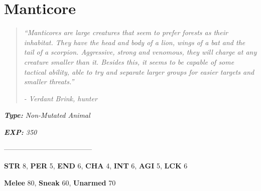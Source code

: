\documentclass[11pt,a4paper,twocolumn]{book}
\begin{document}
	\section*{Manticore}
	\begin{verse}
		\emph{``Manticores are large creatures that seem to prefer forests as their inhabitat. They have the head and body of a lion, wings of a bat and the tail of a scorpion. Aggressive, strong and venomous, they will charge at any creature smaller than it. Besides this, it seems to be capable of some tactical ability, able to try and separate larger groups for easier targets and smaller threats.''}
		
		\emph{-	Verdant Brink, hunter}
	\end{verse}
	
	\noindent
	\emph{\textbf{Type:} Non-Mutated Animal}
	
	\noindent
	\emph{\textbf{EXP:} 350}
	
%		
%	
%		

	--------------------------------------

	\noindent
	\textbf{STR} 8, \textbf{PER} 5, \textbf{END} 6, \textbf{CHA} 4, \textbf{INT} 6, \textbf{AGI} 5, \textbf{LCK} 6
	
	\noindent
	\textbf{Melee} 80, \textbf{Sneak} 60, \textbf{Unarmed} 70
	
\end{document}
